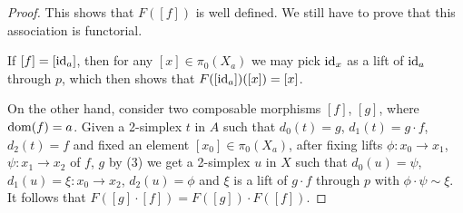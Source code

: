 \documentclass[a4paper,11pt,openany]{scrartcl}
\begin{document}
\begin{proof}
    This shows that $F([f])$ is well defined. We still have to prove that this
    association is functorial.

    If $[f]=[\operatorname{id}_a]$, then for any $[x]\in\pi_0(X_a)$ we may pick $\operatorname{id}_x$ as a
    lift of $\operatorname{id}_a$ through $p$, which then shows that $F([\operatorname{id}_a])([x])=[x]$.

    On the other hand, consider two composable morphisms $[f]$, $[g]$, where
    $\operatorname{dom}(f)=a$. Given a
    2-simplex $t$ in $A$ such that $d_0(t)=g$, $d_1(t)=g\cdot f$, $d_2(t)=f$ and
    fixed an element $[x_0]\in\pi_0(X_a)$, after fixing lifts $\phi\colon
    x_0\rightarrow x_1$, $\psi\colon x_1\rightarrow x_2$ of $f$, $g$ by (3) we
    get a 2-simplex $u$ in $X$
    such that $d_0(u)=\psi$, $d_1(u)=\xi\colon x_0\rightarrow x_2$,
    $d_2(u)=\phi$ and $\xi$ is a lift of $g\cdot f$ through $p$ with
    $\phi\cdot\psi\sim\xi$. It follows that $F([g]\cdot [f])=F([g])\cdot
    F([f])$.
\end{proof}
\end{document}
